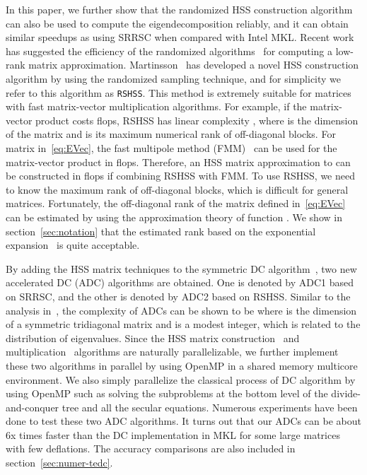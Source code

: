\documentclass[times]{nlaauth}
\newcounter{algorithm}
\begin{document}
  In this paper, we further show that the randomized HSS construction algorithm~\cite{rand-hss} can
  also be used to compute the eigendecomposition reliably, and it can
  obtain similar speedups as using SRRSC when compared with Intel MKL.
  Recent work has suggested the efficiency of the randomized algorithms~\cite{Martinsson-Rev10,Martinsson-PNAS07} for computing a low-rank
  matrix approximation.
  Martinsson~\cite{rand-hss} has developed a novel HSS construction algorithm by using the randomized sampling technique, and
  for simplicity we refer to this algorithm as \texttt{RSHSS}.
  This method is extremely suitable for matrices with fast matrix-vector multiplication algorithms.
  For example, if the matrix-vector product costs  flops, RSHSS
  has linear complexity , where  is the dimension of the matrix and  is its maximum numerical rank of off-diagonal blocks.
  For matrix  in~\eqref{eq:EVec}, the fast multipole method (FMM)~\cite{FMM87,Rokhlin88} can be used for the
  matrix-vector product in  flops.
  Therefore, an HSS matrix approximation to  can be constructed in  flops if combining RSHSS with FMM.
  To use RSHSS, we need to know the maximum rank of off-diagonal blocks,
  which is difficult for general matrices. Fortunately,
  the off-diagonal rank of the matrix  defined in~\eqref{eq:EVec} can be estimated by using the approximation theory of function .
  We show in section~\ref{sec:notation} that the estimated rank based on the exponential expansion~\cite{hackbusch-exp}
  is quite acceptable.

  By adding the HSS matrix techniques to the symmetric DC algorithm~\cite{Cuppen81,Rutter94,Gu-eigenvalue},
  two new accelerated DC (ADC) algorithms are obtained. One is denoted by {ADC1} based on SRRSC,
  and the other is denoted by {ADC2} based on RSHSS.
Similar to the analysis in~\cite{Demmel-book}, the complexity of
  ADCs can be shown to be  where  is the dimension of a symmetric tridiagonal matrix 
  and  is a modest integer, which is related to the distribution of eigenvalues.
  Since the HSS matrix construction~\cite{Hss-ulv,rand-hss,Sherry-PHss}
  and multiplication~\cite{Lyons-thesis} algorithms are naturally parallelizable,
  we further implement these two algorithms in parallel by using OpenMP in a shared
  memory multicore environment.
  We also simply parallelize the classical process of DC algorithm by using OpenMP such
  as solving the subproblems at the bottom level of the divide-and-conquer tree and all the secular equations.
  Numerous experiments have been done to test these two ADC algorithms.
  It turns out that our ADCs can be about 6x times faster than the DC implementation in MKL for some large matrices with few deflations.
  The accuracy comparisons are also included in section~\ref{sec:numer-tedc}.
\end{document}
